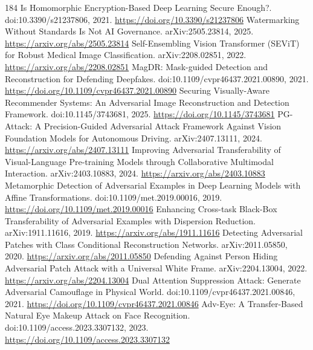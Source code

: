 \documentclass[11pt]{article}
\begin{document}
\begin{thebibliography}{184}
 Is Homomorphic Encryption-Based Deep Learning Secure Enough?. doi:10.3390/s21237806, 2021. \url{https://doi.org/10.3390/s21237806}
 Watermarking Without Standards Is Not AI Governance. arXiv:2505.23814, 2025. \url{https://arxiv.org/abs/2505.23814}
 Self-Ensembling Vision Transformer (SEViT) for Robust Medical Image Classification. arXiv:2208.02851, 2022. \url{https://arxiv.org/abs/2208.02851}
 MagDR: Mask-guided Detection and Reconstruction for Defending Deepfakes. doi:10.1109/cvpr46437.2021.00890, 2021. \url{https://doi.org/10.1109/cvpr46437.2021.00890}
 Securing Visually-Aware Recommender Systems: An Adversarial Image Reconstruction and Detection Framework. doi:10.1145/3743681, 2025. \url{https://doi.org/10.1145/3743681}
 PG-Attack: A Precision-Guided Adversarial Attack Framework Against Vision Foundation Models for Autonomous Driving. arXiv:2407.13111, 2024. \url{https://arxiv.org/abs/2407.13111}
 Improving Adversarial Transferability of Visual-Language Pre-training Models through Collaborative Multimodal Interaction. arXiv:2403.10883, 2024. \url{https://arxiv.org/abs/2403.10883}
 Metamorphic Detection of Adversarial Examples in Deep Learning Models with Affine Transformations. doi:10.1109/met.2019.00016, 2019. \url{https://doi.org/10.1109/met.2019.00016}
 Enhancing Cross-task Black-Box Transferability of Adversarial Examples with Dispersion Reduction. arXiv:1911.11616, 2019. \url{https://arxiv.org/abs/1911.11616}
 Detecting Adversarial Patches with Class Conditional Reconstruction Networks. arXiv:2011.05850, 2020. \url{https://arxiv.org/abs/2011.05850}
 Defending Against Person Hiding Adversarial Patch Attack with a Universal White Frame. arXiv:2204.13004, 2022. \url{https://arxiv.org/abs/2204.13004}
 Dual Attention Suppression Attack: Generate Adversarial Camouflage in Physical World. doi:10.1109/cvpr46437.2021.00846, 2021. \url{https://doi.org/10.1109/cvpr46437.2021.00846}
 Adv-Eye: A Transfer-Based Natural Eye Makeup Attack on Face Recognition. doi:10.1109/access.2023.3307132, 2023. \url{https://doi.org/10.1109/access.2023.3307132}
\end{thebibliography}
\end{document}
